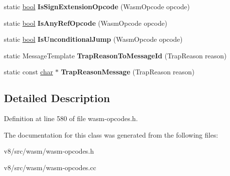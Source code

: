 \begin{DoxyCompactItemize}
static \mbox{\hyperlink{classbool}{bool}} {\bfseries Is\+Sign\+Extension\+Opcode} (Wasm\+Opcode opcode)
\item 
\mbox{\label{classv8_1_1internal_1_1wasm_1_1WasmOpcodes_a5165fa61dfd7026c07b9fc1b7a757536}} 
static \mbox{\hyperlink{classbool}{bool}} {\bfseries Is\+Any\+Ref\+Opcode} (Wasm\+Opcode opcode)
\item 
\mbox{\label{classv8_1_1internal_1_1wasm_1_1WasmOpcodes_a962c13f489a106c5468666efd630dfe6}} 
static \mbox{\hyperlink{classbool}{bool}} {\bfseries Is\+Unconditional\+Jump} (Wasm\+Opcode opcode)
\item 
\mbox{\label{classv8_1_1internal_1_1wasm_1_1WasmOpcodes_a1fe380252e0650bdd4ebb2b86b763d7d}} 
static Message\+Template {\bfseries Trap\+Reason\+To\+Message\+Id} (Trap\+Reason reason)
\item 
\mbox{\label{classv8_1_1internal_1_1wasm_1_1WasmOpcodes_abfd15710274ea846e76b5fc80d41a927}} 
static const \mbox{\hyperlink{classchar}{char}} $\ast$ {\bfseries Trap\+Reason\+Message} (Trap\+Reason reason)
\end{DoxyCompactItemize}


\subsection{Detailed Description}


Definition at line 580 of file wasm-\/opcodes.\+h.



The documentation for this class was generated from the following files\+:\begin{DoxyCompactItemize}
\item 
v8/src/wasm/wasm-\/opcodes.\+h\item 
v8/src/wasm/wasm-\/opcodes.\+cc\end{DoxyCompactItemize}
